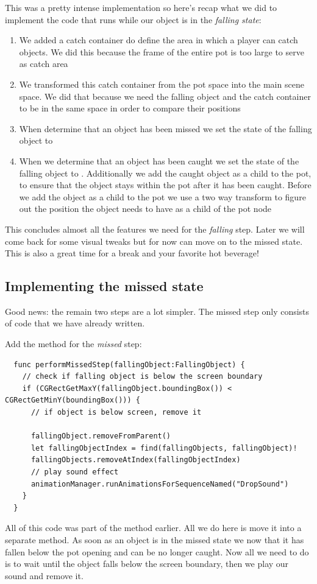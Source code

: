 This was a pretty intense implementation so here's recap what we did to
implement the code that runs while our object is in the \textit{falling state}:
\begin{enumerate}
  \item We added a catch container do define the area in which a player can
  catch objects. We did this because the frame of the entire pot is too large to
  serve as catch area
  \item We transformed this catch container from the pot space into the main
  scene space. We did that because we need the falling object and the catch
  container to be in the same space in order to compare their positions
  \item When determine that an object has been missed we set the state of the
  falling object to 
  \item When we determine that an object has been caught we set the state of the
  falling object to . Additionally we add the caught object
  as a child to the pot, to ensure that the object stays within the pot after it
  has been caught. Before we add the object as a child to the pot we use a two
  way transform to figure out the position the object needs to have as a child
  of the pot node
\end{enumerate}

This concludes almost all the features we need for the \textit{falling} step.
Later we will come back for some visual tweaks but for now can move on to the
missed state. This is also a great time for a break and your favorite hot
beverage!
\subsection{Implementing the missed state}
Good news: the remain two steps are a lot simpler. The missed step only consists
of code that we have already written.
\begin{leftbar}
Add the method for the \textit{missed} step:
\begin{lstlisting}
  func performMissedStep(fallingObject:FallingObject) {
    // check if falling object is below the screen boundary
    if (CGRectGetMaxY(fallingObject.boundingBox()) < CGRectGetMinY(boundingBox())) {
      // if object is below screen, remove it
      
      fallingObject.removeFromParent()
      let fallingObjectIndex = find(fallingObjects, fallingObject)!
      fallingObjects.removeAtIndex(fallingObjectIndex)
      // play sound effect
      animationManager.runAnimationsForSequenceNamed("DropSound")
    }
  }
\end{lstlisting}
\end{leftbar}
All of this code was part of the  method earlier. All we do
here is move it into a separate method. As soon as an object is in the missed
state we now that it has fallen below the pot opening and can be no longer
caught. Now all we need to do is to wait until the object falls below the
screen boundary, then we play our sound and remove it.

